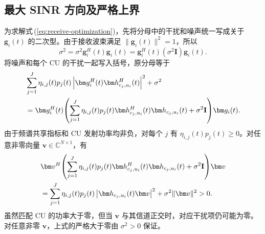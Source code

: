 \subsection{最大 SINR 方向及严格上界}
为求解式\,(\ref{eq:receive-optimization})，先将分母中的干扰和噪声统一写成关于 $\bm g_i(t)$ 的二次型。由于接收波束满足 $\|\bm g_i(t)\|^2=1$，所以
\begin{equation}
\sigma^2=\sigma^2\bm g_i^H(t)\bm g_i(t)
=\bm g_i^H(t)(\sigma^2\mathbf I)\bm g_i(t).
\end{equation}
将噪声和每个 CU 的干扰一起写入括号，原分母等于
\begin{align}\label{eq:denominator}
&\sum_{j=1}^J\eta_{i,j}(t)p_j(t)
\left|\bm g_i^H(t)\bm h_{c_j,u_i}^{H}(t)\right|^2+\sigma^2\notag\\
&=\bm g_i^H(t)\!\left(\sum_{j=1}^J\eta_{i,j}(t)p_j(t)
\bm h_{c_j,u_i}^{H}(t)\bm h_{c_j,u_i}(t)+\sigma^2\mathbf I\right)\!\bm g_i(t).
\end{align}
由于频谱共享指标和 CU 发射功率均非负，对每个 $j$ 有 $\eta_{i,j}(t)p_j(t)\ge0$。对任意非零向量 $\bm v\in\mathbb C^{N\times1}$，有
\begin{align}
&\bm v^H\!\left(\sum_{j=1}^J\eta_{i,j}(t)p_j(t)
\bm h_{c_j,u_i}^{H}(t)\bm h_{c_j,u_i}(t)+\sigma^2\mathbf I\right)\!\bm v\notag\\
&=\sum_{j=1}^J\eta_{i,j}(t)p_j(t)
\left|\bm h_{c_j,u_i}(t)\bm v\right|^2+\sigma^2\|\bm v\|^2>0.
\end{align}
虽然匹配 CU 的功率大于零，但当 $\bm v$ 与其信道正交时，对应干扰项仍可能为零。对任意非零 $\bm v$，上式的严格大于零由 $\sigma^2>0$ 保证。
